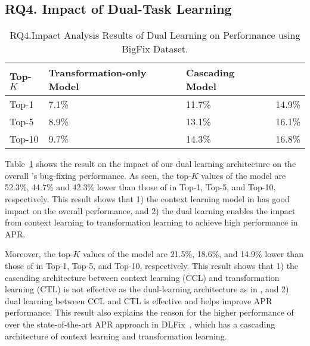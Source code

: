 \subsection{\bf RQ4. Impact of Dual-Task Learning}



\begin{table}[t]
  \caption{RQ4.Impact Analysis Results of Dual Learning on Performance using BigFix Dataset.}
  \vspace{-6pt}
	{\small
		\begin{center}
			\renewcommand{\arraystretch}{1}
			\begin{tabular}{p{1cm}<{\centering}|p{2.7cm}<{\centering}|p{1.7cm}<{\centering}|p{1cm}<{\centering}}
				\hline
				Top-$K$ & Transformation-only Model & Cascading Model &  \tool \\			
				\hline
				Top-1   & 7.1\% & 11.7\% & 14.9\% \\ \hline
				Top-5	& 8.9\% & 13.1\% & 16.1\% \\ \hline
				Top-10	& 9.7\% & 14.3\% & 16.8\%\\ \hline
			
				\hline
			\end{tabular}
			\label{fig:rq4_results}
		\end{center}
	}
\end{table}

Table~\ref{fig:rq4_results} shows the result on the impact of our dual
learning architecture on the overall {\tool}'s bug-fixing performance.
As seen, the top-$K$ values of the  model
are 52.3\%, 44.7\% and 42.3\% lower than those of {\tool} in Top-1,
Top-5, and Top-10, respectively. This result shows that 1) the context
learning model in {\tool} has good impact on the overall performance,
and 2) the dual learning enables the impact from context learning to
transformation learning to achieve high performance in APR.

Moreover, the top-$K$ values of the  model are 21.5\%,
18.6\%, and 14.9\% lower than those of {\tool} in Top-1, Top-5, and
Top-10, respectively. This result shows that 1) the cascading
architecture between context learning (CCL) and transformation
learning (CTL) is not effective as the dual-learning architecture as
in {\tool}, and 2) dual learning between CCL and CTL is effective and
helps improve APR performance. This result also explains the reason
for the higher performance of {\tool} over the state-of-the-art APR
approach in DLFix~\cite{icse20}, which has a cascading architecture of
context learning and transformation learning.



